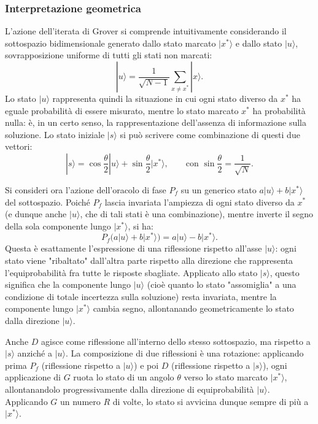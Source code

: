 \subsubsection{Interpretazione geometrica}
L'azione dell'iterata di Grover si comprende intuitivamente considerando il sottospazio bidimensionale generato dallo stato marcato $|x^*\rangle$ e dallo stato $|u\rangle$, sovrapposizione uniforme di tutti gli stati non marcati:
\begin{equation}
  |u\rangle = \frac{1}{\sqrt{N-1}}\sum_{x \neq x^*}|x\rangle.
\end{equation}
Lo stato $|u\rangle$ rappresenta quindi la situazione in cui ogni stato diverso da $x^*$ ha eguale probabilità di essere misurato, mentre lo stato marcato $x^*$ ha probabilità nulla: è, in un certo senso, la rappresentazione dell'assenza di informazione sulla soluzione. Lo stato iniziale $|s\rangle$ si può scrivere come combinazione di questi due vettori:
\begin{equation}
  |s\rangle = \cos{\frac{\theta}{2}}|u\rangle + \sin{\frac{\theta}{2}}|x^*\rangle, \qquad \text{con } \sin{\frac{\theta}{2}} = \frac{1}{\sqrt{N}}.
\end{equation}

Si consideri ora l'azione dell'oracolo di fase $P_f$ su un generico stato $a|u\rangle + b|x^*\rangle$ del sottospazio. Poiché $P_f$ lascia invariata l'ampiezza di ogni stato diverso da $x^*$ (e dunque anche $|u\rangle$, che di tali stati è una combinazione), mentre inverte il segno della sola componente lungo $|x^*\rangle$, si ha:
\begin{equation}
  P_f\big(a|u\rangle + b|x^*\rangle\big) = a|u\rangle - b|x^*\rangle.
\end{equation}
Questa è esattamente l'espressione di una riflessione rispetto all'asse $|u\rangle$: ogni stato viene "ribaltato" dall'altra parte rispetto alla direzione che rappresenta l'equiprobabilità fra tutte le risposte sbagliate. Applicato allo stato $|s\rangle$, questo significa che la componente lungo $|u\rangle$ (cioè quanto lo stato "assomiglia" a una condizione di totale incertezza sulla soluzione) resta invariata, mentre la componente lungo $|x^*\rangle$ cambia segno, allontanando geometricamente lo stato dalla direzione $|u\rangle$.

Anche $D$ agisce come riflessione all'interno dello stesso sottospazio, ma rispetto a $|s\rangle$ anziché a $|u\rangle$. La composizione di due riflessioni è una rotazione: applicando prima $P_f$ (riflessione rispetto a $|u\rangle$) e poi $D$ (riflessione rispetto a $|s\rangle$), ogni applicazione di $G$ ruota lo stato di un angolo $\theta$ verso lo stato marcato $|x^*\rangle$, allontanandolo progressivamente dalla direzione di equiprobabilità $|u\rangle$. Applicando $G$ un numero $R$ di volte, lo stato si avvicina dunque sempre di più a $|x^*\rangle$.
